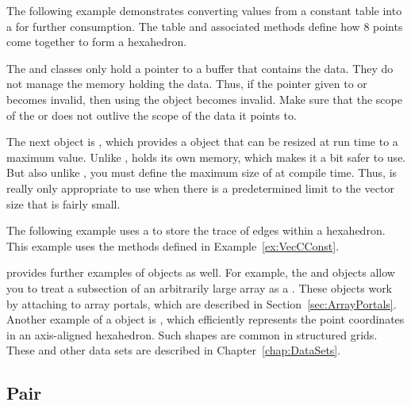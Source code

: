 The following example demonstrates converting values from a constant table into a  for further consumption.
The table and associated methods define how 8 points come together to form a hexahedron.


\begin{commonerrors}
  The  and  classes only hold a pointer to a buffer that contains the data.
  They do not manage the memory holding the data.
  Thus, if the pointer given to  or  becomes invalid, then using the object becomes invalid.
  Make sure that the scope of the  or  does not outlive the scope of the data it points to.
\end{commonerrors}

The next \Veclike object is , which provides a \Veclike object that can be resized at run time to a maximum value.
Unlike ,  holds its own memory, which makes it a bit safer to use.
But also unlike , you must define the maximum size of  at compile time.
Thus,  is really only appropriate to use when there is a predetermined limit to the vector size that is fairly small.

The following example uses a  to store the trace of edges within a hexahedron.
This example uses the methods defined in Example~\ref{ex:VecCConst}.


\VTKm provides further examples of \Veclike objects as well.
For example, the  and  objects allow you to treat a subsection of an arbitrarily large array as a .
These objects work by attaching to array portals, which are described in Section~\ref{sec:ArrayPortals}.
Another example of a \Veclike object is , which efficiently represents the point coordinates in an axis-aligned hexahedron.
Such shapes are common in structured grids.
These and other data sets are described in Chapter~\ref{chap:DataSets}.



\subsection{Pair}
\label{sec:Pair}

